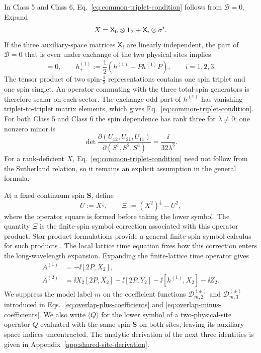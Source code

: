 In Class 5 and Class 6, Eq.~\eqref{eq:common-triplet-condition} follows from
$\mathcal B=0$.  Expand
\begin{equation}
X=\mathsf X_0\otimes\mathbf{1}_2+\mathsf X_i\otimes\sigma^i.
\label{eq:common-X-rank-expansion}
\end{equation}
If the three auxiliary-space matrices $\mathsf X_i$ are linearly independent,
the part of $\mathcal B=0$ that is even under exchange of the two physical
sites implies
\begin{equation}
[h^{(1)}_+,\sigma^i_1+\sigma^i_2]=0,
\qquad
h^{(1)}_+:=\frac12\left(h^{(1)}+Ph^{(1)}P\right),
\qquad i=1,2,3.
\label{eq:common-even-Sutherland}
\end{equation}
The tensor product of two spin-$\tfrac12$ representations contains one spin
triplet and one spin singlet.  An operator commuting with the three total-spin
generators is therefore scalar on each sector.  The exchange-odd part of
$h^{(1)}$ has vanishing triplet-to-triplet matrix elements, which gives
Eq.~\eqref{eq:common-triplet-condition}.  For both Class 5 and Class 6 the
spin dependence has rank three for $\lambda\ne0$; one nonzero minor is
\begin{equation}
\det\frac{\partial(U_{12},U_{21},U_{11})}
{\partial(S^1,S^2,S^3)}
=\frac{\ii}{32\lambda^3}.
\label{eq:common-model-rank-minor}
\end{equation}
For a rank-deficient $X$, Eq.~\eqref{eq:common-triplet-condition} need not
follow from the Sutherland relation, so it remains an explicit assumption in
the general formula.

At a fixed continuum spin $\boldsymbol S$, define
\begin{equation}
U:=X^\downarrow,
\qquad
\Xi:=(X^2)^\downarrow-U^2,
\label{eq:common-Xi-definition}
\end{equation}
where the operator square is formed before taking the lower symbol.  The
quantity $\Xi$ is the finite-spin symbol correction associated with this
operator product.  Star-product formulations provide a general finite-spin
symbol calculus for such products \cite{KoczorZeierGlaser2019}.  The local
lattice time equation fixes how this correction enters the long-wavelength
expansion.  Expanding the finite-lattice time operator gives
\begin{align}
A^{(1)}&=-\ii[2P,X_2],
\nonumber\\
A^{(2)}&=\ii X_2[2P,X_2]-\ii[2P,Y_2]
-\ii[h^{(1)},X_2]-\ii Z_2.
\label{eq:common-time-coefficients}
\end{align}
We suppress the model label $m$ on the coefficient functions
$\mathcal D^{(\pm)}_{m,2}$ and $\mathcal D^{(\pm)}_{m,3}$ introduced in
Eqs.~\eqref{eq:overlap-plus-coefficients} and
\eqref{eq:overlap-minus-coefficients}.  We also write $\langle Q\rangle$ for
the lower symbol of a two-physical-site operator $Q$ evaluated with the same
spin $\boldsymbol S$ on both sites, leaving its auxiliary-space indices
uncontracted.  The analytic derivation of the next three identities is given
in Appendix~\ref{app:shared-site-derivation}.

